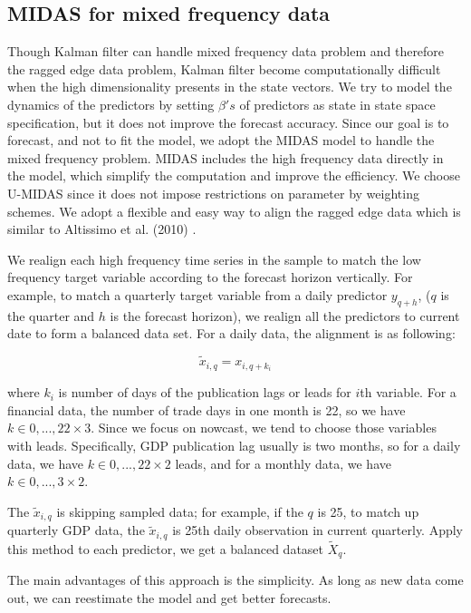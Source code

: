 \subsection{MIDAS for mixed frequency data}

Though Kalman filter can handle mixed frequency data problem and therefore the ragged edge data problem, Kalman filter become computationally difficult when the high dimensionality presents in the state vectors.  We try to model the dynamics of the predictors by setting $\beta's$ of predictors as state in state space specification, but it does not improve the forecast accuracy. Since our goal is to forecast, and not to fit the model,  we adopt the MIDAS model to handle the mixed frequency problem. MIDAS includes the high frequency data directly in the model, which simplify the computation and improve the efficiency. We choose U-MIDAS since it does not impose restrictions on parameter by weighting schemes. We adopt a flexible and easy way to align the ragged edge data which is similar to Altissimo et al. (2010) . 

We realign each  high frequency time series in the sample to match the low frequency target variable according to the  forecast horizon  vertically. For example, to match a quarterly target variable from a daily predictor $y_{q+h}$, ($q$ is the quarter and $h$ is the forecast horizon), we realign all the predictors to current date to form a balanced data set. For a daily data, the alignment is as following:

$$\tilde x_{i, q} = x_{i, q + k_{i}}$$

where $k_{i}$ is number of days of the publication lags or leads for $i$th variable. For a financial data, the number of trade days in one month is 22, so we have $k \in {0, ...,22 \times 3}$. Since we focus on nowcast, we tend to choose those variables with leads. Specifically, GDP publication lag usually is two months, so for a daily data, we have $k \in {0, ...,22 \times 2}$ leads, and for a monthly data, we have $k \in {0, ..., 3 \times 2}$. 

The $\tilde x_{i, q}$ is skipping sampled data; for example, if the $q$ is 25, to match up quarterly GDP data, the $\tilde x_{i, q}$ is 25th daily observation in current quarterly. Apply this method to each predictor, we get a balanced dataset $\tilde X_q$. 

The main advantages of this approach is the simplicity. As long as new data come out, we can reestimate the model and get better forecasts. 

